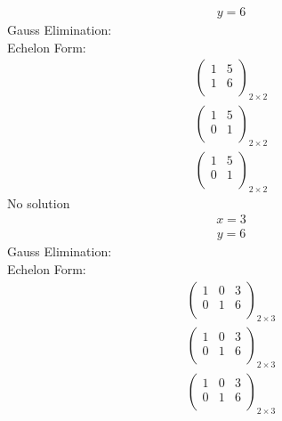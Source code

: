 \documentclass{article}
\begin{document}
\begin{align*}
y=6\end{align*}
Gauss Elimination:\\
Echelon Form:\\
\begin{align*}
\left(
\begin{array}{c|c}
1 & 5\\
1 & 6\\
\end{array}
\right)_{2\times 2}
\end{align*}
\begin{align*}
\left(
\begin{array}{c|c}
1 & 5\\
0 & 1\\
\end{array}
\right)_{2\times 2}
\end{align*}
\begin{align*}
\left(
\begin{array}{c|c}
1 & 5\\
0 & 1\\
\end{array}
\right)_{2\times 2}
\end{align*}
No solution\\
\begin{align*}
x=3\end{align*}
\begin{align*}
y=6\end{align*}
Gauss Elimination:\\
Echelon Form:\\
\begin{align*}
\left(
\begin{array}{cc|c}
1 & 0 & 3\\
0 & 1 & 6\\
\end{array}
\right)_{2\times 3}
\end{align*}
\begin{align*}
\left(
\begin{array}{cc|c}
1 & 0 & 3\\
0 & 1 & 6\\
\end{array}
\right)_{2\times 3}
\end{align*}
\begin{align*}
\left(
\begin{array}{cc|c}
1 & 0 & 3\\
0 & 1 & 6\\
\end{array}
\right)_{2\times 3}
\end{align*}
\end{document}
